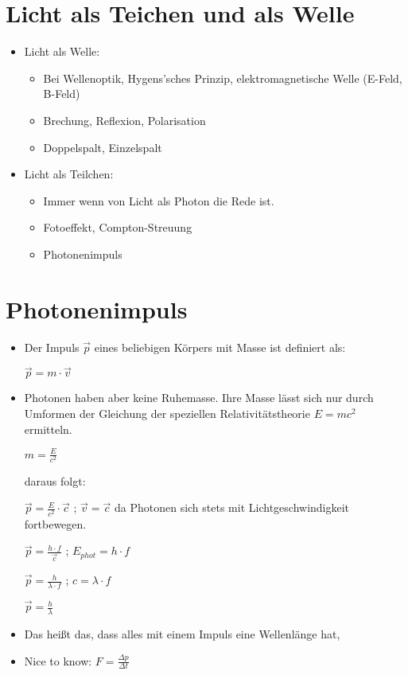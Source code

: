 \section{Licht als Teichen und als Welle}
\begin{itemize}
\item Licht als Welle:
	\begin{itemize}
	\item Bei Wellenoptik, Hygens'sches Prinzip, elektromagnetische Welle (E-Feld, B-Feld)
	\item Brechung, Reflexion, Polarisation
	\item Doppelspalt, Einzelspalt
	\end{itemize}
\item Licht als Teilchen:
	\begin{itemize}
	\item Immer wenn von Licht als Photon die Rede ist.
	\item Fotoeffekt, Compton-Streuung
	\item Photonenimpuls
	\end{itemize}
\end{itemize}

\section{Photonenimpuls}
\begin{itemize}
\item Der Impuls $\vec{p}$ eines beliebigen Körpers mit Masse ist definiert als: 

$\vec{p} = m \cdot \vec{v}$
\item Photonen haben aber keine Ruhemasse. Ihre Masse lässt sich nur durch Umformen der Gleichung der speziellen Relativitätstheorie $E = mc^2$ ermitteln.

$m = \frac{E}{c^2}$

daraus folgt:

$\vec{p} = \frac{E}{c^2} \cdot \vec{c}$  ; $\vec{v} = \vec{c}$ da Photonen sich stets mit Lichtgeschwindigkeit fortbewegen.

$\vec{p} = \frac{h \cdot f}{\vec{c}}$  ; $E_{phot} = h \cdot f$

$\vec{p} = \frac{h}{\lambda \cdot f}$  ; $c = \lambda \cdot f$

$\vec{p} = \frac{h}{\lambda}$
\item Das heißt das, dass alles mit einem Impuls eine Wellenlänge hat, 
\item Nice to know: $F = \frac{\Delta p}{\Delta t}$
\end{itemize}

